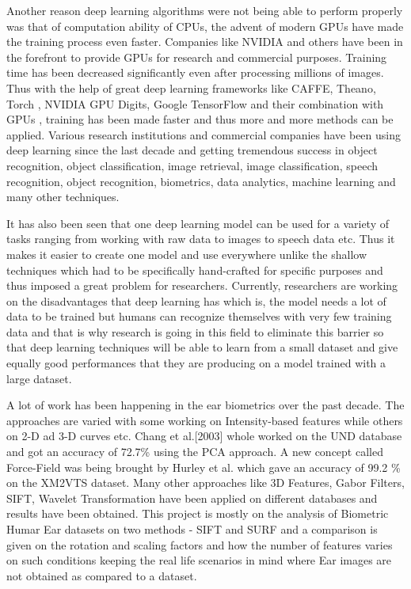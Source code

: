 Another reason deep learning algorithms were not being able to perform properly was that of computation ability of CPUs, the advent of modern GPUs have made the training process even faster. Companies like NVIDIA and others have been in the forefront to provide GPUs for research and commercial purposes. Training time has been decreased significantly even after processing millions of images. Thus with the help of great deep learning frameworks like CAFFE\cite{caffe}, Theano\cite{theano}, Torch\cite{torch} , NVIDIA  GPU \cite{digits} Digits, Google TensorFlow\cite{tensorflow} and their combination with GPUs , training has been made faster and thus more and more methods can be applied. Various research institutions and commercial companies have been using deep learning since the last decade and getting tremendous success in object recognition, object classification, image retrieval, image classification, speech recognition, object recognition, biometrics, data analytics, machine learning and many other techniques.

It has also been seen that one deep learning model can be used for a variety of tasks ranging from working with raw data to images to speech data etc. Thus it makes it easier to create one model and use everywhere unlike the shallow techniques which had to be specifically hand-crafted for specific purposes and thus imposed a great problem for researchers. Currently, researchers are working on the disadvantages that deep learning has which is, the model needs a lot of data to be trained but humans can recognize themselves with very few training data and that is why research is going in this field to eliminate this barrier so that deep learning techniques will be able to learn from a small dataset and give equally good performances that they are producing on a model trained with a large dataset.

A lot of work has been happening in the ear biometrics over the past decade. The approaches are varied with some working on Intensity-based features while others on 2-D ad 3-D curves etc. Chang et al.[2003] whole worked on the UND database and got an accuracy of 72.7{\%} using the PCA\cite{pca} approach. A new concept called Force-Field was being brought by Hurley\cite{hurley} et al. which gave an accuracy of 99.2 {\%} on the XM2VTS dataset. Many other approaches like 3D Features, Gabor Filters, SIFT, Wavelet Transformation have been applied on different databases and results have been obtained. This project is mostly on the analysis of Biometric Humar Ear datasets on two methods - SIFT and SURF and a comparison is given on the rotation and scaling factors and how the number of features varies on such conditions keeping the real life scenarios in mind where Ear images are not obtained as compared to a dataset.


